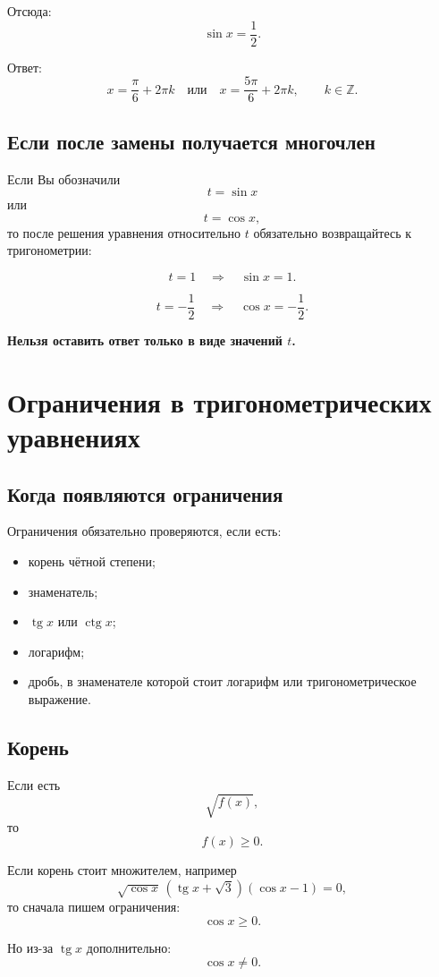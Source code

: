 \documentclass[a4paper,12pt]{article}
\providecommand{\tg}{\mathop{\mathrm{tg}}\nolimits}
\providecommand{\ctg}{\mathop{\mathrm{ctg}}\nolimits}
\newcommand{\important}[1]{\textcolor{darkaccent}{\textbf{#1}}}
\begin{document}
Отсюда:
\[
\sin x=\frac12.
\]

Ответ:
\[
x=\frac{\pi}{6}+2\pi k
\quad\text{или}\quad
x=\frac{5\pi}{6}+2\pi k,
\qquad k\in\mathbb Z.
\]

\subsection{Если после замены получается многочлен}

Если Вы обозначили
\[
t=\sin x
\]
или
\[
t=\cos x,
\]
то после решения уравнения относительно $t$ обязательно возвращайтесь к тригонометрии:

\[
t=1\quad\Rightarrow\quad \sin x=1.
\]

\[
t=-\frac12\quad\Rightarrow\quad \cos x=-\frac12.
\]

\important{Нельзя оставить ответ только в виде значений $t$.}

\section{Ограничения в тригонометрических уравнениях}

\subsection{Когда появляются ограничения}

Ограничения обязательно проверяются, если есть:

\begin{itemize}
  \item корень чётной степени;
  \item знаменатель;
  \item $\tg x$ или $\ctg x$;
  \item логарифм;
  \item дробь, в знаменателе которой стоит логарифм или тригонометрическое выражение.
\end{itemize}

\subsection{Корень}

Если есть
\[
\sqrt{f(x)},
\]
то
\[
f(x)\ge0.
\]

Если корень стоит множителем, например
\[
\sqrt{\cos x}\,(\tg x+\sqrt3)(\cos x-1)=0,
\]
то сначала пишем ограничения:
\[
\cos x\ge0.
\]

Но из-за $\tg x$ дополнительно:
\[
\cos x\ne0.
\]
\end{document}
